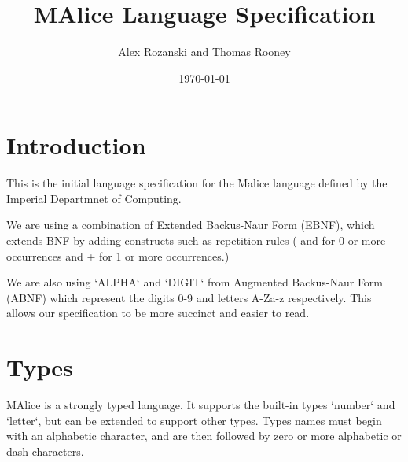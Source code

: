 \documentclass[a4wide, 11pt]{article}
\begin{document}
\title{MAlice Language Specification}

\author{Alex Rozanski and Thomas Rooney}

\date{\today}         %

\maketitle            %

\section{Introduction}

This is the initial language specification for the Malice language defined by the Imperial Departmnet of Computing. 

We are using a combination of Extended Backus-Naur Form (EBNF), which extends BNF by adding constructs such as repetition rules ({ and } for 0 or more occurrences and + for 1 or more occurrences.)

We are also using `ALPHA` and `DIGIT` from Augmented Backus-Naur Form (ABNF) which represent the digits 0-9 and letters A-Za-z respectively. This allows our specification to be more succinct and easier to read.




\section{Types}

MAlice is a strongly typed language. It supports the built-in types `number` and `letter`, but can be extended to support other types. Types names must begin with an alphabetic character, and are then followed by zero or more alphabetic or dash characters.
\end{document}
